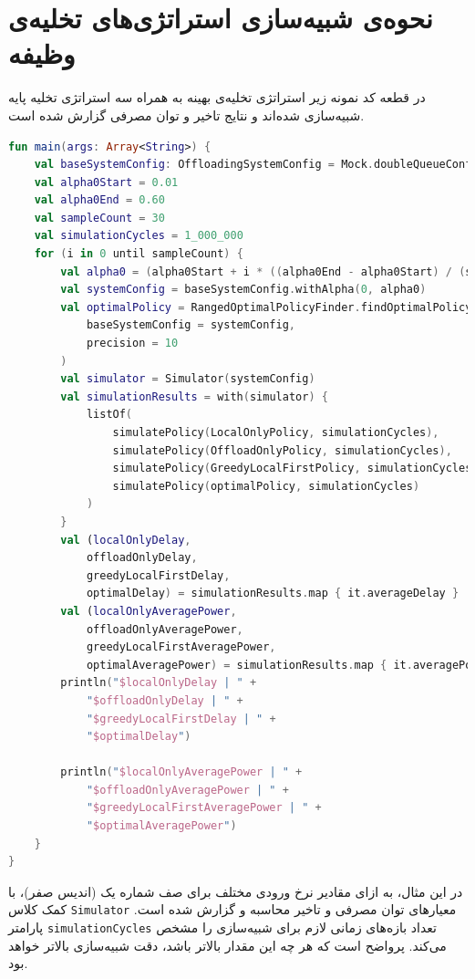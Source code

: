\section{نحوه‌ی شبیه‌سازی استراتژی‌های تخلیه‌ی وظیفه}
در قطعه کد نمونه زیر استراتژی تخلیه‌ی بهینه به همراه سه استراتژی تخلیه پایه شبیه‌سازی شده‌اند و نتایج تاخیر و توان مصرفی گزارش شده است.
\begin{LTR}
	\begin{lstlisting}[language=Kotlin, caption={شبیه‌سازی استراتژی‌های تخلیه‌ی وظیفه}, captiondirection=RTL, label={lst:sim}, showstringspaces=false]
fun main(args: Array<String>) {
	val baseSystemConfig: OffloadingSystemConfig = Mock.doubleQueueConfig()
	val alpha0Start = 0.01
	val alpha0End = 0.60
	val sampleCount = 30
	val simulationCycles = 1_000_000
	for (i in 0 until sampleCount) {
		val alpha0 = (alpha0Start + i * ((alpha0End - alpha0Start) / (sampleCount - 1)))
		val systemConfig = baseSystemConfig.withAlpha(0, alpha0)
		val optimalPolicy = RangedOptimalPolicyFinder.findOptimalPolicy(
			baseSystemConfig = systemConfig,
			precision = 10
		)
		val simulator = Simulator(systemConfig)
		val simulationResults = with(simulator) {
			listOf(
				simulatePolicy(LocalOnlyPolicy, simulationCycles),
				simulatePolicy(OffloadOnlyPolicy, simulationCycles),
				simulatePolicy(GreedyLocalFirstPolicy, simulationCycles),
				simulatePolicy(optimalPolicy, simulationCycles)
			)
		}
		val (localOnlyDelay,
			offloadOnlyDelay,
			greedyLocalFirstDelay,
			optimalDelay) = simulationResults.map { it.averageDelay }
		val (localOnlyAveragePower,
			offloadOnlyAveragePower,
			greedyLocalFirstAveragePower,
			optimalAveragePower) = simulationResults.map { it.averagePowerConsumption }
		println("$localOnlyDelay | " +
			"$offloadOnlyDelay | " +
			"$greedyLocalFirstDelay | " +
			"$optimalDelay")
		
		println("$localOnlyAveragePower | " +
			"$offloadOnlyAveragePower | " +
			"$greedyLocalFirstAveragePower | " +
			"$optimalAveragePower")
	}
}
	\end{lstlisting}
\end{LTR}
در این مثال، به ازای مقادیر نرخ ورودی مختلف برای صف شماره یک (اندیس صفر)، با کمک کلاس \texttt{\footnotesize Simulator} معیارهای توان مصرفی و تاخیر محاسبه و گزارش شده است. پارامتر \texttt{\footnotesize simulationCycles} تعداد بازه‌های زمانی لازم برای شبیه‌سازی را مشخص می‌کند. پرواضح است که هر چه این مقدار بالاتر باشد، دقت شبیه‌سازی بالاتر خواهد بود. 
\newpage